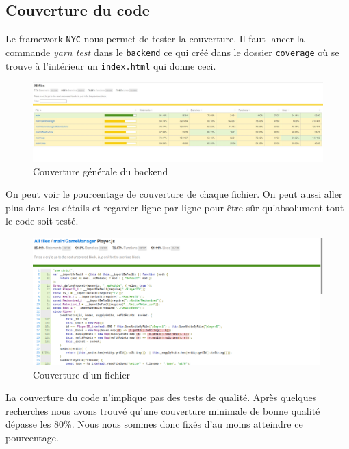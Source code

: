 \subsection{Couverture du code}

Le framework \lstinline{NYC} nous permet de tester la couverture. Il faut lancer la commande \emph{yarn test} dans le \lstinline{backend} ce qui créé dans le dossier \lstinline{coverage} où se trouve à l'intérieur un \lstinline{index.html} qui donne ceci.

\begin{figure}[H]
    \centering
    \includegraphics[scale=0.35]{data/couverture_test_1.jpg}
    \caption{Couverture générale du backend}
\end{figure}

On peut voir le pourcentage de couverture de chaque fichier. On peut aussi aller plus dans les détails et regarder ligne par ligne pour être sûr qu'absolument tout le code soit testé.

\begin{figure}[H]
    \centering
    \includegraphics[scale=0.3]{data/couverture_test_2.png}
    \caption{Couverture d'un fichier}
\end{figure}

La couverture du code n'implique pas des tests de qualité. Après quelques recherches nous avons trouvé qu'une couverture minimale de bonne qualité dépasse les 80\%. Nous nous sommes donc fixés d'au moins atteindre ce pourcentage.